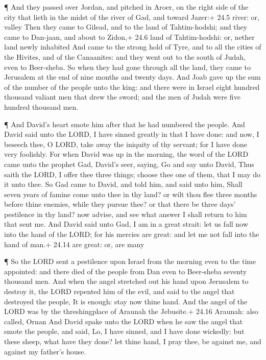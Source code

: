  ¶ And they passed over Jordan, and pitched in Aroer, on the
right side of the city that lieth in the midst of the river of Gad, and
toward Jazer:+ 24.5 river: or, valley  Then they came to
Gilead, and to the land of Tahtim-hodshi; and they came to Dan-jaan, and
about to Zidon,+ 24.6 land of Tahtim-hodshi: or, nether land newly
inhabited  And came to the strong hold of Tyre, and to all
the cities of the Hivites, and of the Canaanites: and they went out to
the south of Judah, even to Beer-sheba.  So when they had
gone through all the land, they came to Jerusalem at the end of nine
months and twenty days.  And Joab gave up the sum of the
number of the people unto the king: and there were in Israel eight
hundred thousand valiant men that drew the sword; and the men of Judah
were five hundred thousand men.

 ¶ And David's heart smote him after that he had numbered
the people. And David said unto the LORD, I have sinned greatly in that
I have done: and now, I beseech thee, O LORD, take away the iniquity of
thy servant; for I have done very foolishly.  For when
David was up in the morning, the word of the LORD came unto the prophet
Gad, David's seer, saying,  Go and say unto David, Thus
saith the LORD, I offer thee three things; choose thee one of them, that
I may do it unto thee.  So Gad came to David, and told him,
and said unto him, Shall seven years of famine come unto thee in thy
land? or wilt thou flee three months before thine enemies, while they
pursue thee? or that there be three days' pestilence in thy land? now
advise, and see what answer I shall return to him that sent me.
 And David said unto Gad, I am in a great strait: let us
fall now into the hand of the LORD; for his mercies are great: and let
me not fall into the hand of man.+ 24.14 are great: or, are many

 ¶ So the LORD sent a pestilence upon Israel from the
morning even to the time appointed: and there died of the people from
Dan even to Beer-sheba seventy thousand men.  And when the
angel stretched out his hand upon Jerusalem to destroy it, the LORD
repented him of the evil, and said to the angel that destroyed the
people, It is enough: stay now thine hand. And the angel of the LORD was
by the threshingplace of Araunah the Jebusite.+ 24.16 Araunah: also
called, Ornan  And David spake unto the LORD when he saw
the angel that smote the people, and said, Lo, I have sinned, and I have
done wickedly: but these sheep, what have they done? let thine hand, I
pray thee, be against me, and against my father's house.

